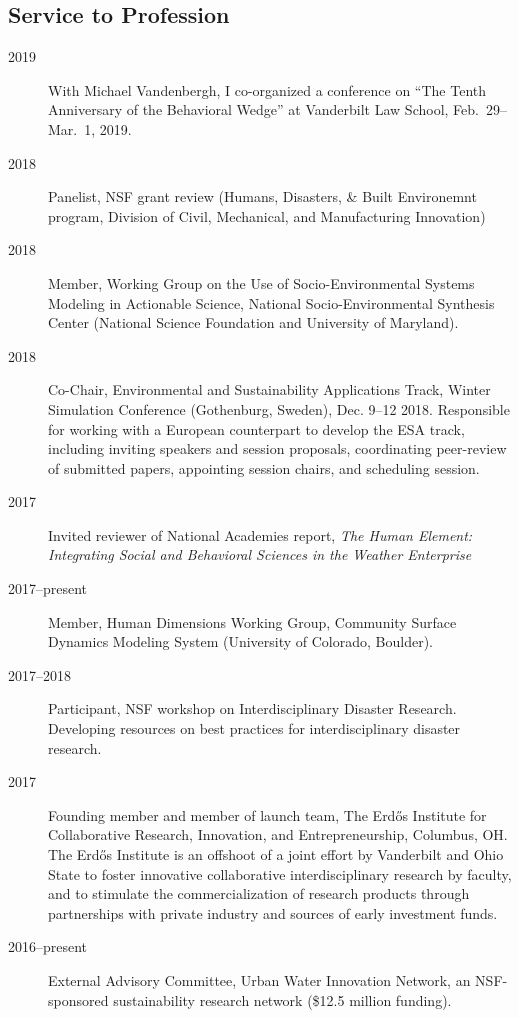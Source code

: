 \documentclass[10pt]{article}
\begin{document}
	\subsection{Service to Profession}
    	\begin{description}
            \item[2019] With Michael Vandenbergh, I co-organized a conference on ``The Tenth Anniversary of the Behavioral Wedge'' at Vanderbilt Law School, Feb.~29--Mar.~1, 2019.
            \item[2018] Panelist, NSF grant review (Humans, Disasters, \& Built Environemnt program, Division of Civil, Mechanical, and Manufacturing Innovation)
            \item[2018] Member, Working Group on the Use of Socio-Environmental Systems Modeling in Actionable Science, National Socio-Environmental Synthesis Center (National Science Foundation and University of Maryland).
            \item[2018] Co-Chair, Environmental and Sustainability Applications Track, Winter Simulation Conference (Gothenburg, Sweden), Dec. 9--12 2018. Responsible for working with a European counterpart to develop the ESA track, including inviting speakers and session proposals, coordinating peer-review of submitted papers, appointing session chairs, and scheduling session.
            \item[2017] Invited reviewer of National Academies report, \emph{The Human Element: Integrating Social and Behavioral Sciences in the Weather Enterprise}
            \item[2017--present] Member, Human Dimensions Working Group, Community Surface Dynamics Modeling System (University of Colorado, Boulder).
            \item[2017--2018] Participant, NSF workshop on Interdisciplinary Disaster Research. Developing resources on best practices for interdisciplinary disaster research.
            \item[2017] Founding member and member of launch team, The Erd\H{o}s Institute for Collaborative Research, Innovation, and Entrepreneurship, Columbus, OH. The Erd\H{o}s Institute is an offshoot of
            a joint effort by Vanderbilt and Ohio State to foster innovative collaborative interdisciplinary research by faculty, and to stimulate the commercialization of research products through partnerships
            with private industry and sources of early investment funds.
            \item[2016--present] External Advisory Committee, Urban Water Innovation Network, an NSF-sponsored sustainability research network (\$12.5 million funding).

\end{description}
\end{document}
